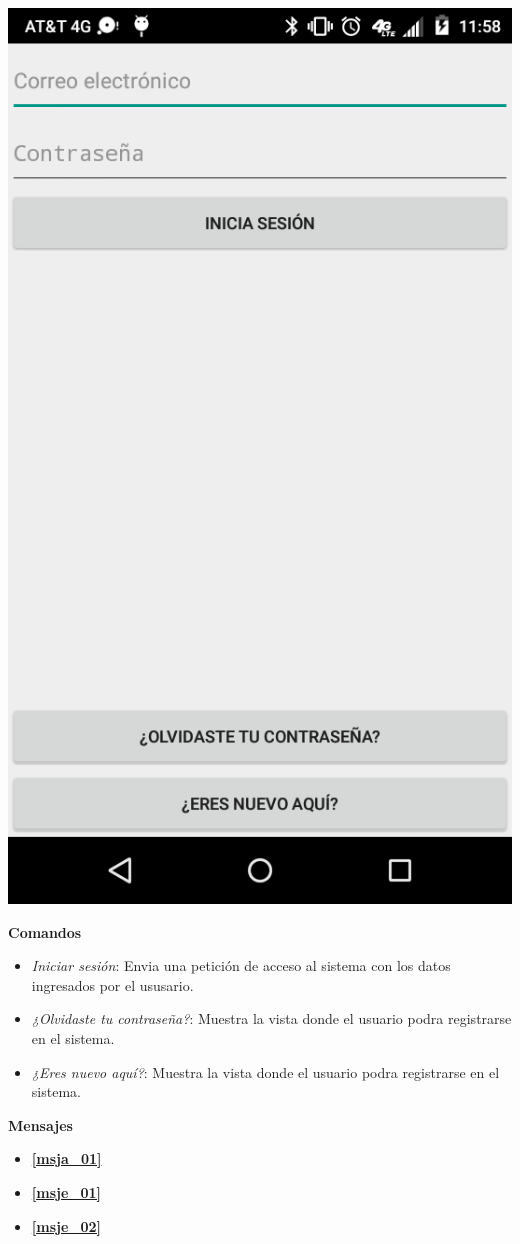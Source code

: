     \begin{center}
      \includegraphics[scale=.2]{Capitulo3/img/gui/IU_Iniciar_sesion.png}
      \label{fig:iu03_fig}
    \end{center}
  \textbf{Comandos}
    \begin{itemize}
      \item \textit{Iniciar sesión}: Envia una petición de acceso al sistema con los datos ingresados por el ususario.
      \item \textit{¿Olvidaste tu contraseña?}: Muestra la vista \textbf{} donde el usuario podra registrarse en el sistema.
      \item \textit{¿Eres nuevo aquí?}: Muestra la vista \textbf{} donde el usuario podra registrarse en el sistema.
    \end{itemize}
\textbf{Mensajes}
  \begin{itemize}
     \item \textbf{\ref{msja_01}}
     \item \textbf{\ref{msje_01}}
     \item \textbf{\ref{msje_02}}
  \end{itemize}
  
